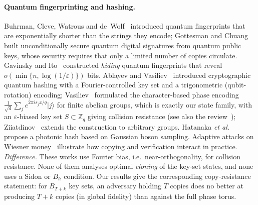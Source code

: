 \documentclass[11pt]{article}
\theoremstyle{definition}
\theoremstyle{remark}
\begin{document}
\paragraph{Quantum fingerprinting and hashing.}
Buhrman, Cleve, Watrous and de~Wolf~\cite{Buhrman2001} introduced quantum fingerprints that are exponentially shorter than the strings they encode; Gottesman and Chuang~\cite{GottesmanChuang2001} built unconditionally secure quantum digital signatures from quantum public keys, whose security requires that only a limited number of copies circulate.
Gavinsky and Ito~\cite{GavinskyIto2013} constructed \emph{hiding} quantum fingerprints that reveal $o(\min\{n,\log(1/\varepsilon)\})$ bits.
Ablayev and Vasiliev~\cite{AblayevVasiliev2014} introduced cryptographic quantum hashing with a Fourier-controlled key set and a trigonometric (qubit-rotation) encoding; Vasiliev~\cite{Vasiliev2016} formulated the character-based phase encoding $\frac1{\sqrt d}\sum_j e^{2\pi i s_jx/q}\lvert j\rangle$ for finite abelian groups, which is exactly our state family, with an $\varepsilon$-biased key set $S\subset\mathbb{Z}_q$ giving collision resistance (see also the review~\cite{Ablayev2025}); Ziiatdinov~\cite{Ziiatdinov2016} extends the construction to arbitrary groups.
Hatanaka \emph{et al.}~\cite{Hatanaka2024} propose a photonic hash based on Gaussian boson sampling.
Adaptive attacks on Wiesner money~\cite{Nagaj2016} illustrate how copying and verification interact in practice.
\emph{Difference.} These works use Fourier bias, i.e.\ near-orthogonality, for collision resistance.
None of them analyses optimal \emph{cloning} of the key-set states, and none uses a Sidon or $B_h$ condition.
Our results give the corresponding copy-resistance statement: for $B_{T+k}$ key sets, an adversary holding $T$ copies does no better at producing $T+k$ copies (in global fidelity) than against the full phase torus.
\end{document}
